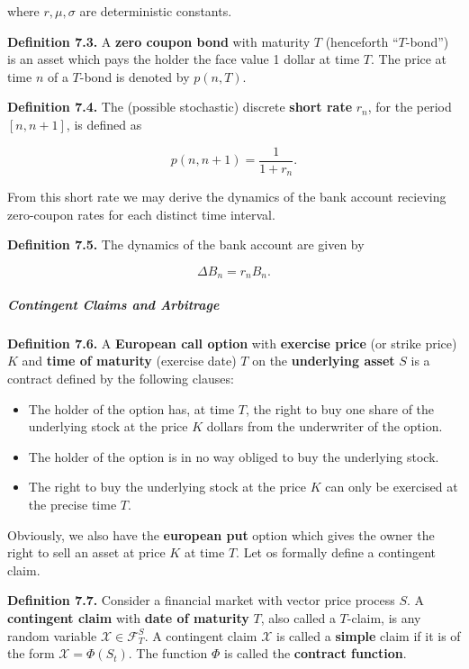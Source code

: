 \documentclass[
]{article}
\providecommand{\tightlist}{%
  \setlength{\itemsep}{0pt}\setlength{\parskip}{0pt}}
\begin{document}
where \(r,\mu,\sigma\) are deterministic constants.

\textbf{Definition 7.3.} A \textbf{zero coupon bond} with maturity \(T\)
(henceforth ``\(T\)-bond'') is an asset which pays the holder the face
value 1 dollar at time \(T\). The price at time \(n\) of a \(T\)-bond is
denoted by \(p(n,T)\).

\textbf{Definition 7.4.} The (possible stochastic) discrete
\textbf{short rate} \(r_n\), for the period \([n,n+1]\), is defined as

\[
p(n,n+1)=\frac{1}{1+ r_n}.
\]

From this short rate we may derive the dynamics of the bank account
recieving zero-coupon rates for each distinct time interval.

\textbf{Definition 7.5.} The dynamics of the bank account are given by

\[
\Delta B_n=r_n B_n.
\]

\hypertarget{contingent-claims-and-arbitrage}{%
\subparagraph{Contingent Claims and
Arbitrage}\label{contingent-claims-and-arbitrage}}

\textbf{Definition 7.6.} A \textbf{European call option} with
\textbf{exercise price} (or strike price) \(K\) and \textbf{time of
maturity} (exercise date) \(T\) on the \textbf{underlying asset} \(S\)
is a contract defined by the following clauses:

\begin{itemize}
\tightlist
\item
  The holder of the option has, at time \(T\), the right to buy one
  share of the underlying stock at the price \(K\) dollars from the
  underwriter of the option.
\item
  The holder of the option is in no way obliged to buy the underlying
  stock.
\item
  The right to buy the underlying stock at the price \(K\) can only be
  exercised at the precise time \(T\).
\end{itemize}

Obviously, we also have the \textbf{european put} option which gives the
owner the right to sell an asset at price \(K\) at time \(T\). Let os
formally define a contingent claim.

\textbf{Definition 7.7.} Consider a financial market with vector price
process \(S\). A \textbf{contingent claim} with \textbf{date of
maturity} \(T\), also called a \(T\)-claim, is any random variable
\(\mathcal{X}\in\mathcal{F}_T^S\). A contingent claim \(\mathcal{X}\) is
called a \textbf{simple} claim if it is of the form
\(\mathcal{X} = \Phi(S_t)\). The function \(\Phi\) is called the
\textbf{contract function}.
\end{document}
